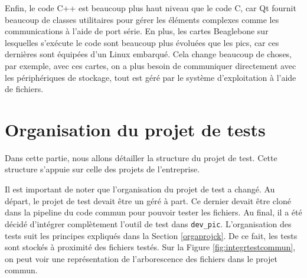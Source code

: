 \documentclass[a4paper]{article}
\begin{document}
Enfin, le code C++ est beaucoup plus haut niveau que le code C, car Qt fournit
beaucoup de classes utilitaires pour gérer les éléments complexes comme les
communications à l'aide de port série. En plus, les cartes Beaglebone sur
lesquelles s'exécute le code sont beaucoup plus évoluées que les \gls{pic}s, car
ces dernières sont équipées d'un Linux embarqué. Cela change beaucoup de choses,
par exemple, avec ces cartes, on a plus besoin de communiquer directement avec
les périphériques de stockage, tout est géré par le système d'exploitation à
l'aide de fichiers.
\section{Organisation du projet de tests}%

Dans cette partie, nous allons détailler la structure du projet de test. Cette
structure s'appuie sur celle des projets de l'entreprise.

Il est important de noter que l'organisation du projet de test a changé. Au
départ, le projet de test devait être un géré à part. Ce dernier devait être
cloné dans la pipeline du code commun pour pouvoir tester les fichiers. Au
final, il a été décidé d'intégrer complètement l'outil de test dans
\verb|dev_pic|. L'organisation des tests suit les principes expliqués dans la
Section \ref{orgaprojck}. De ce fait, les tests sont stockés à proximité des
fichiers testés. Sur la Figure \ref{fig:integrtestcommun}, on peut voir une
représentation de l'arborescence des fichiers dans le projet commun.
\end{document}
